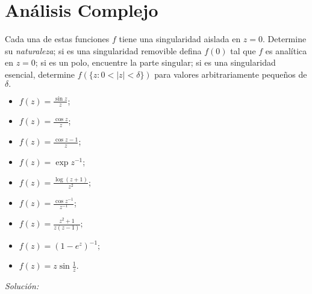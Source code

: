\documentclass[12pt]{article}
\newenvironment{problem}[2][Problema]{\begin{trivlist}
\item[\hskip \labelsep {\bfseries #1}\hskip \labelsep {\bfseries #2.}]}{\end{trivlist}}
\begin{document}
\section*{Análisis Complejo}
\text{ }

\begin{problem}{1 pp. 110}
Cada una de estas funciones $f$ tiene una singularidad aislada en $z=0$. Determine su \textit{naturaleza}; si es una singularidad removible defina $f(0)$ tal que $f$ es analítica en $z=0$; si es un polo, encuentre la parte singular; si es una singularidad esencial, determine $f(\{z: 0 < \lvert z \rvert < \delta \})$ para valores arbitrariamente pequeños de $\delta.$

\begin{itemize}
    \item [(a)] $f(z) = \frac{\sin z}{z}$; 
    \item [(b)] $f(z) = \frac{\cos z}{z}$;
    \item [(c)] $f(z) = \frac{\cos z - 1}{z}$;
    \item [(d)] $f(z) = \exp z^{-1}$;
    \item [(e)] $f(z) = \frac{\log(z+1)}{z^2}$;
    \item [(f)] $f(z) = \frac{\cos z^{-1}}{z^{-1}}$;
    \item [(g)] $f(z) = \frac{z^2 +1}{z (z-1)};$
    \item [(h)] $f(z) = (1 - e^z)^{-1};$
    \item [(i)] $f(z) = z \sin \frac{1}{z}.$
\end{itemize}
\end{problem}
\textit{Solución:}
\end{document}
